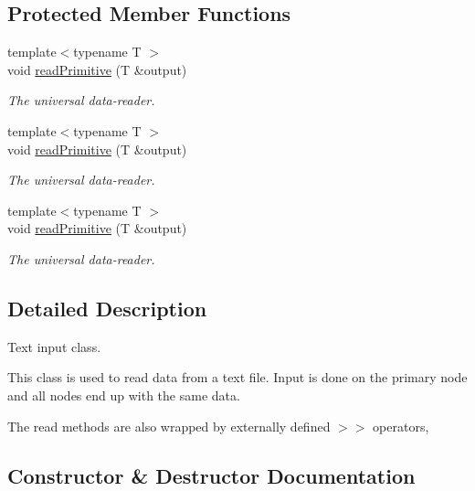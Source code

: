 \subsection*{Protected Member Functions}
\begin{DoxyCompactItemize}
\item 
{\footnotesize template$<$typename T $>$ }\\void \mbox{\hyperlink{classENSEM_1_1TextReader_afa5fccab911c19d1365a51f39df01d96}{read\+Primitive}} (T \&output)
\begin{DoxyCompactList}\small\item\em The universal data-\/reader. \end{DoxyCompactList}\item 
{\footnotesize template$<$typename T $>$ }\\void \mbox{\hyperlink{classENSEM_1_1TextReader_afa5fccab911c19d1365a51f39df01d96}{read\+Primitive}} (T \&output)
\begin{DoxyCompactList}\small\item\em The universal data-\/reader. \end{DoxyCompactList}\item 
{\footnotesize template$<$typename T $>$ }\\void \mbox{\hyperlink{classENSEM_1_1TextReader_afa5fccab911c19d1365a51f39df01d96}{read\+Primitive}} (T \&output)
\begin{DoxyCompactList}\small\item\em The universal data-\/reader. \end{DoxyCompactList}\end{DoxyCompactItemize}


\subsection{Detailed Description}
Text input class. 

This class is used to read data from a text file. Input is done on the primary node and all nodes end up with the same data.

The read methods are also wrapped by externally defined $>$$>$ operators, 

\subsection{Constructor \& Destructor Documentation}
\mbox{\label{classENSEM_1_1TextReader_a139e8717032f310089148dd58b30d1d2}} 
